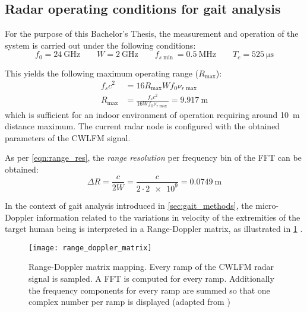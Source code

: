 \subsection{Radar operating conditions for gait analysis} \label{sec:radar_operating_conditions}

For the purpose of this Bachelor's Thesis, the measurement and operation of the system is carried out under the following conditions:
\begin{equation} \label{eq:if_conditions}
	f_0 = \SI{24}{\giga\hertz} \qquad W = \SI{2}{\giga\hertz} \qquad f_{s\min} = \SI{0.5}{\mega\hertz} \qquad T_c = \SI{525}{\micro\second}
\end{equation}

This yields the following maximum operating range ($R_{\max}$):
\begin{align}
	f_s c^2 &= 16 R_{\max}W f_0 \nu_{r\max} \\
	R_{\max} &= \frac{f_s c^2}{16 W f_0 \nu_{r\max}} = \SI{9.917}{\meter}
\end{align}
which is sufficient for an indoor environment of operation requiring around \SI{10}{\meter} distance maximum. The current radar node is configured with the obtained parameters of the CWLFM signal.

As per \cref{eqn:range_res}, the \textit{range resolution} per frequency bin of the FFT can be obtained:
\begin{equation} \label{eqn:range_res_ours}
	\Delta R = \frac{c}{2W} = \frac{c}{2 \cdot \num{2e9}} = \SI{0.0749}{\metre}
\end{equation}

In the context of gait analysis introduced in \cref{sec:gait_methods}, the micro-Doppler information related to the variations in velocity of the extremities of the target human being is interpreted in a Range-Doppler matrix, as illustrated in \cref{fig:range_doppler_matrix} \cite{Amin2017,Richards2010,Senigagliesi2020}.

\begin{figure}[ht]
	\centering
	\texttt{[image: range\_doppler\_matrix]}
	\caption[Temporal characteristics of a human gait cycle]{Range-Doppler matrix mapping. Every ramp of the CWLFM radar signal is sampled. A FFT is computed for every ramp. Additionally the frequency components for every ramp are summed so that one complex number per ramp is displayed   (adapted from \cite{Zanardi2021})}
	\label{fig:range_doppler_matrix}
\end{figure}

